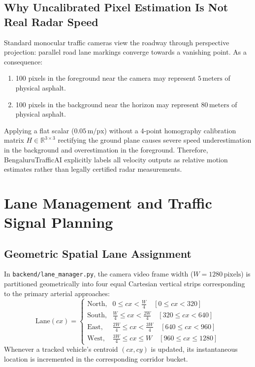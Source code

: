 \documentclass[11pt,a4paper,oneside]{report}
\begin{document}
\section{Why Uncalibrated Pixel Estimation Is Not Real Radar Speed}
\begin{limitationbox}
Standard monocular traffic cameras view the roadway through perspective projection: parallel road lane markings converge towards a vanishing point. As a consequence:
\begin{enumerate}
    \item 100 pixels in the foreground near the camera may represent $5\,\text{meters}$ of physical asphalt.
    \item 100 pixels in the background near the horizon may represent $80\,\text{meters}$ of physical asphalt.
\end{enumerate}
Applying a flat scalar ($0.05\,\text{m/px}$) without a 4-point homography calibration matrix $H \in \mathbb{R}^{3 \times 3}$ rectifying the ground plane causes severe speed underestimation in the background and overestimation in the foreground. Therefore, BengaluruTrafficAI explicitly labels all velocity outputs as relative motion estimates rather than legally certified radar measurements.
\end{limitationbox}



\chapter{Lane Management and Traffic Signal Planning}

\section{Geometric Spatial Lane Assignment}
In \texttt{backend/lane\_manager.py}, the camera video frame width ($W = 1280\,\text{pixels}$) is partitioned geometrically into four equal Cartesian vertical strips corresponding to the primary arterial approaches:
\begin{equation}
\text{Lane}(cx) =
\begin{cases}
\text{North}, & 0 \le cx < \frac{W}{4} \quad [0 \le cx < 320] \\
\text{South}, & \frac{W}{4} \le cx < \frac{2W}{4} \quad [320 \le cx < 640] \\
\text{East}, & \frac{2W}{4} \le cx < \frac{3W}{4} \quad [640 \le cx < 960] \\
\text{West}, & \frac{3W}{4} \le cx \le W \quad [960 \le cx \le 1280]
\end{cases}
\end{equation}
Whenever a tracked vehicle's centroid $(cx, cy)$ is updated, its instantaneous location is incremented in the corresponding corridor bucket.
\end{document}
